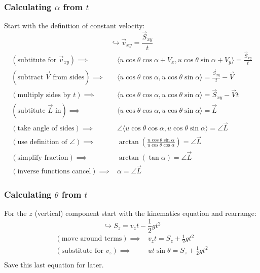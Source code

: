 \documentclass{article}
\begin{document}
\subsubsection*{Calculating $\alpha$ from $t$}
Start with the definition of constant velocity:
\[ \hookrightarrow\vec{v}_{xy}=\frac{\vec{S}_{xy}}{t} \]
\begin{align*}
    (\text{subtitute for }\vec{v}_{xy})\implies&\langle u\cos\theta\cos\alpha+V_x,u\cos\theta\sin\alpha+V_y \rangle=\frac{\vec{S}_{xy}}{t} \\
    (\text{subtract }\vec{V}\text{ from sides})\implies&\langle u\cos\theta\cos\alpha,u\cos\theta\sin\alpha \rangle=\frac{\vec{S}_{xy}}{t}-\vec{V} \\
    (\text{multiply sides by }t)\implies&\langle u\cos\theta\cos\alpha,u\cos\theta\sin\alpha \rangle=\vec{S}_{xy}-\vec{V}t \\
    (\text{subtitute }\vec{L}\text{ in})\implies&\langle u\cos\theta\cos\alpha,u\cos\theta\sin\alpha \rangle=\vec{L} \\
    (\text{take angle of sides})\implies&\angle\langle u\cos\theta\cos\alpha,u\cos\theta\sin\alpha \rangle=\angle\vec{L} \\
    (\text{use definition of }\angle)\implies&\arctan\left(\frac{u\cos\theta\sin\alpha}{u\cos\theta\cos\alpha}\right)=\angle\vec{L} \\
    (\text{simplify fraction})\implies&\arctan(\tan\alpha)=\angle\vec{L} \\
    (\text{inverse functions cancel})\implies&\boxed{\alpha=\angle\vec{L}}
\end{align*}

\subsubsection*{Calculating $\theta$ from $t$}
For the $z$ (vertical) component start with the kinematics equation and rearrange:
\[ \hookrightarrow S_z=v_zt-\frac{1}{2}gt^2 \]
\begin{align*}
    (\text{move around terms})\implies&v_zt=S_z+\frac{1}{2}gt^2 \\
    (\text{substitute for }v_z)\implies&ut\sin\theta=S_z+\frac{1}{2}gt^2 \\
\end{align*}
Save this last equation for later.
\end{document}
